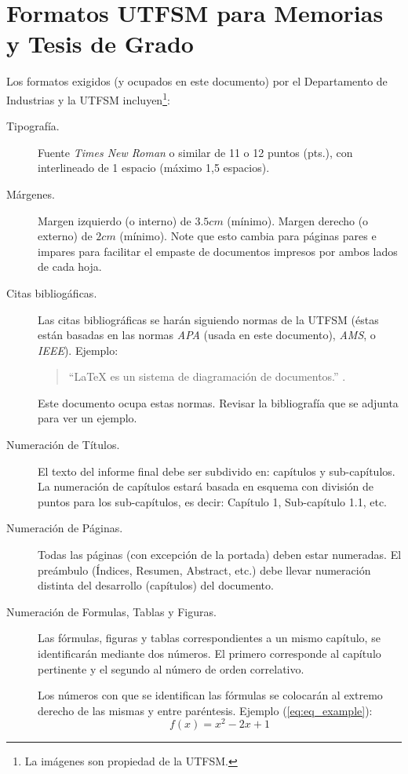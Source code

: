 
\chapter{Formatos UTFSM para Memorias y Tesis de Grado }

Los formatos exigidos (y ocupados en este documento) por el Departamento de Industrias y la UTFSM incluyen\footnote{La imágenes son propiedad de la UTFSM.}:

\begin{description}
\item[Tipografía.] Fuente \emph{Times New Roman} o similar de 11 o 12 puntos (pts.), con interlineado de 1 espacio (máximo 1,5 espacios).
\item[Márgenes.] Margen izquierdo (o interno) de $3.5cm$ (mínimo). Margen derecho (o externo) de $2cm$ (mínimo). Note que esto cambia para páginas pares e impares para facilitar el empaste de documentos impresos por ambos lados de cada hoja.
\item[Citas bibliogáficas.] Las citas bibliográficas se harán siguiendo normas de la UTFSM (éstas están basadas en las normas \emph{APA} (usada en este documento), \emph{AMS}, o \emph{IEEE}). Ejemplo:

\begin{quote}
    ``\LaTeX{} es un sistema de diagramación de documentos.'' \citep{Lamport94}.
\end{quote}

Este documento ocupa estas normas. Revisar la bibliografía que se adjunta para ver un ejemplo.

\item[Numeración de Títulos.] El texto del informe final debe ser subdivido en: capítulos y sub-capítulos. La numeración de capítulos estará basada en esquema con división de puntos para los sub-capítulos, es decir: Capítulo 1, Sub-capítulo 1.1, etc.
\item[Numeración de Páginas.] Todas las páginas (con excepción de la portada) deben estar numeradas. El preámbulo (Índices, Resumen, Abstract, etc.) debe llevar numeración distinta del desarrollo (capítulos) del documento.
\item[Numeración de Formulas, Tablas y Figuras.] Las fórmulas, figuras y tablas correspondientes a un mismo capítulo, se identificarán mediante dos números. El primero corresponde al capítulo pertinente y el segundo al número de orden correlativo.


Los números con que se identifican las fórmulas se colocarán al extremo derecho de las mismas y entre paréntesis. Ejemplo (\autoref{eq:eq_example}):
\begin{equation}
f(x) = x^2-2x+1
\label{eq:eq_example}
\end{equation}


\end{description}
